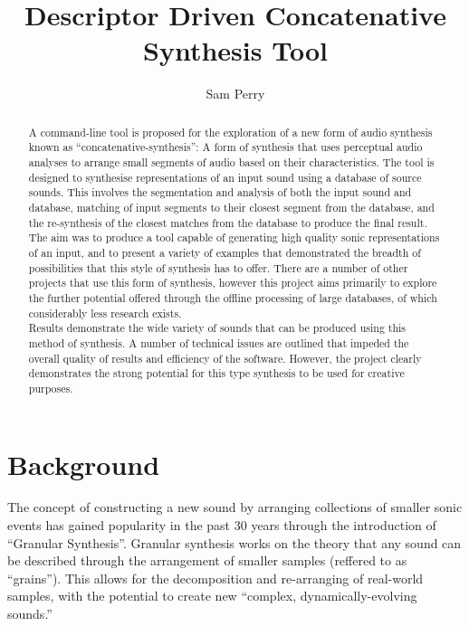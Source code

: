 \documentclass{scrartcl}
\begin{document}
    \title{Descriptor Driven Concatenative Synthesis Tool}
    \author{Sam Perry}

    \maketitle


    \begin{abstract} 
    A command-line tool is proposed for the exploration of a new form of audio
    synthesis known as ``concatenative-synthesis'': A form of synthesis that uses
    perceptual audio analyses to arrange small segments of audio based on their
    characteristics.  The tool is designed to synthesise representations of an
    input sound using a database of source sounds. This involves the
    segmentation and analysis of both the input sound and database, matching of
    input segments to their closest segment from the database, and the
    re-synthesis of the closest matches from the database to produce the final
    result.\\

    The aim was to produce a tool capable of generating high quality sonic
    representations of an input, and to present a variety of examples that
    demonstrated the breadth of possibilities that this style of synthesis has
    to offer. There are a number of other projects that use this form of
    synthesis, however this project aims primarily to explore the further
    potential offered through the offline processing of large databases, of
    which considerably less research exists.\\

    Results demonstrate the wide variety of sounds that can be produced using
    this method of synthesis. A number of technical issues are outlined that
    impeded the overall quality of results and efficiency of the software.
    However, the project clearly demonstrates the strong potential for this
    type synthesis to be used for creative purposes.
    \end{abstract}

    \section*{Background}
    The concept of constructing a new sound by arranging collections of smaller
    sonic events has gained popularity in the past 30 years through the
    introduction of ``Granular Synthesis''. Granular synthesis works on the
    theory that any sound can be described through the arrangement of smaller
    samples (reffered to as ``grains''). This allows for the decomposition and
    re-arranging of real-world samples, with the potential to create new
    ``complex, dynamically-evolving sounds.''~\parencite[p.1]{itgs1988cr}
\end{document}
